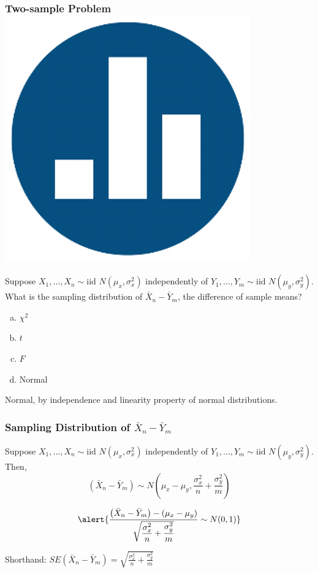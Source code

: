 \documentclass[handout]{beamer}
\begin{document}
\begin{frame}
\frametitle{Two-sample Problem \hfill \includegraphics[scale = 0.05]{./images/clicker}}
Suppose $X_1, \hdots, X_{n} \sim \mbox{iid } N(\mu_x, \sigma^2_x)$ independently of $Y_1, \hdots, Y_{m} \sim \mbox{iid } N(\mu_y, \sigma^2_y)$. What is the \alert{sampling distribution} of $\bar{X}_n - \bar{Y}_m$, the difference of sample means?

\begin{enumerate}[(a)]
	\item $\chi^2$
	\item $t$
	\item $F$
	\item Normal
\end{enumerate}

\pause
\vspace{1em}

\alert{Normal, by independence and linearity property of normal distributions.}
\end{frame}
\begin{frame}
\frametitle{Sampling Distribution of $\bar{X}_n - \bar{Y}_m$}
Suppose $X_1, \hdots, X_{n} \sim \mbox{iid } N(\mu_x, \sigma^2_x)$ independently of $Y_1, \hdots, Y_{m} \sim \mbox{iid } N(\mu_y, \sigma^2_y)$. Then,
	$$\left(\bar{X}_n - \bar{Y}_m\right) \sim N \left( \mu_x - \mu_y, \frac{\sigma_x^2}{n} + \frac{\sigma_y^2}{m} \right) $$
	

$$\alert{\frac{\left(\bar{X}_n - \bar{Y}_m\right) - (\mu_x - \mu_y)}{\sqrt{\displaystyle\frac{\sigma_x^2}{n} + \frac{\sigma_y^2}{m} }}\sim N(0,1)}$$


Shorthand: $SE(\bar{X}_n - \bar{Y}_m) = \sqrt{\displaystyle\frac{\sigma_x^2}{n} + \frac{\sigma_y^2}{m} }$

\end{frame}
\end{document}
